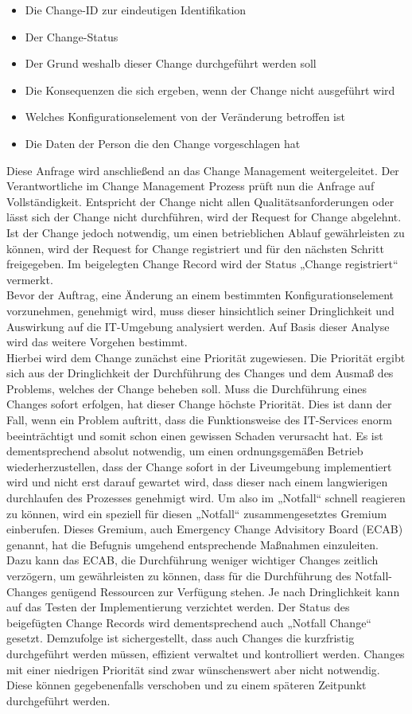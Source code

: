 \begin{itemize}
	\item Die Change-ID zur eindeutigen Identifikation
	\item Der Change-Status
	\item Der Grund weshalb dieser Change durchgeführt werden soll
	\item 	Die Konsequenzen die sich ergeben, wenn der Change nicht ausgeführt wird 
	\item 	Welches Konfigurationselement von der Veränderung betroffen ist
	\item Die Daten der Person die den Change vorgeschlagen hat 
\end{itemize}
Diese Anfrage wird anschließend an das Change Management weitergeleitet. Der Verantwortliche im Change Management Prozess prüft nun die Anfrage auf Vollständigkeit. Entspricht der Change nicht allen Qualitätsanforderungen oder lässt sich der Change nicht durchführen, wird der Request for Change abgelehnt.
 Ist der Change jedoch notwendig, um einen betrieblichen Ablauf gewährleisten zu können, wird der Request for Change registriert und für den nächsten Schritt freigegeben. Im beigelegten Change Record wird der Status „Change registriert“ vermerkt. 
\\
Bevor der Auftrag, eine Änderung an einem bestimmten Konfigurationselement vorzunehmen, genehmigt wird, muss dieser hinsichtlich seiner Dringlichkeit und Auswirkung auf die IT-Umgebung analysiert werden. Auf Basis dieser Analyse wird das weitere Vorgehen bestimmt.
\\
Hierbei wird dem Change zunächst eine Priorität zugewiesen. Die Priorität ergibt sich aus der Dringlichkeit der Durchführung des Changes und dem Ausmaß des Problems, welches der Change beheben soll. 
Muss die Durchführung eines Changes sofort erfolgen, hat dieser Change höchste Priorität. Dies ist dann der Fall, wenn ein Problem auftritt, dass die Funktionsweise des IT-Services enorm beeinträchtigt und somit schon einen gewissen Schaden verursacht hat. 
Es ist dementsprechend absolut notwendig, um einen ordnungsgemäßen Betrieb wiederherzustellen, dass der Change sofort in der Liveumgebung implementiert wird und nicht erst darauf gewartet wird, dass dieser nach einem langwierigen durchlaufen des Prozesses genehmigt wird. Um  also im „Notfall“ schnell reagieren zu können, wird ein speziell für diesen „Notfall“ zusammengesetztes Gremium einberufen. 
Dieses Gremium, auch Emergency Change Advisitory Board (ECAB) genannt, hat die Befugnis umgehend entsprechende Maßnahmen einzuleiten. Dazu kann das ECAB, die Durchführung weniger wichtiger Changes zeitlich verzögern, um gewährleisten zu können, dass für die Durchführung des Notfall-Changes genügend Ressourcen zur Verfügung stehen. Je nach Dringlichkeit kann auf das Testen der Implementierung verzichtet werden. Der Status des beigefügten Change Records wird dementsprechend auch „Notfall Change“ gesetzt. Demzufolge ist sichergestellt, dass auch Changes die kurzfristig durchgeführt werden müssen, effizient verwaltet und kontrolliert werden.  Changes mit einer niedrigen Priorität sind zwar wünschenswert aber nicht notwendig. Diese können gegebenenfalls verschoben und zu einem späteren Zeitpunkt durchgeführt werden.

